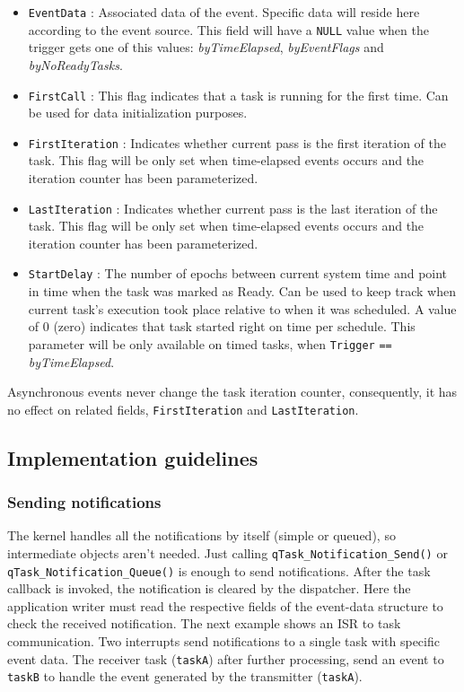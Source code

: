 \begin{itemize}
    \item \lstinline{EventData} : Associated data of the event. Specific data will reside here according to the event source. This field will have a \lstinline{NULL} value when the trigger gets one of this values:  \textit{byTimeElapsed}, \textit{byEventFlags} and \textit{byNoReadyTasks}.
    \item \lstinline{FirstCall} : This flag indicates that a task is running for the first time. Can be used for data initialization purposes.
    \item \lstinline{FirstIteration} : Indicates whether current pass is the first iteration of the task. This flag will be only set when time-elapsed events occurs and the iteration counter has been parameterized. 
    \item \lstinline{LastIteration} : Indicates whether current pass is the last iteration of the task. This flag will be only set when time-elapsed events occurs and the iteration counter has been parameterized. 
    \item \lstinline{StartDelay} : The number of epochs between current system time and point in time when the task was marked as Ready.
    Can be used to keep track when current task's execution took place relative to when it was scheduled. A value of 0 (zero) indicates that task started right on time per schedule.
    This parameter will be only available on timed tasks, when \lstinline{Trigger} \lstinline{==} \textit{byTimeElapsed}. 
\end{itemize}    

\bigskip

\begin{tcolorbox}
\HandRight Asynchronous events never change the task iteration counter, consequently, it has no effect on related fields, \lstinline{FirstIteration} and \lstinline{LastIteration}.
\end{tcolorbox}
    
\subsection{Implementation guidelines}
\subsubsection{Sending notifications}

The kernel handles all the notifications by itself (simple or queued), so intermediate objects aren't needed. Just calling \lstinline{qTask_Notification_Send()} or \lstinline{qTask_Notification_Queue()} is enough to send notifications. After the task callback is invoked, the notification is cleared by the dispatcher. Here the application writer must read the respective fields of the event-data structure to check the received notification. 
\medskip
The next example shows an ISR to task communication. Two interrupts send notifications to a single task with specific event data. The receiver task (\lstinline{taskA}) after further processing, send an event to \lstinline{taskB} to handle the event generated by the transmitter (\lstinline{taskA}).
\medskip

